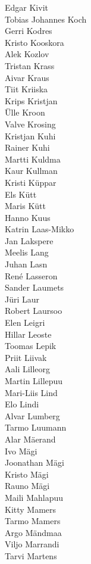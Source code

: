 \begin{multicols}{3}
Edgar Kivit\\
Tobias Johannes Koch\\
Gerri Kodres\\
Kristo Kooskora\\
Alek Kozlov\\
Tristan Krass\\
Aivar Kraus\\
Tiit Kriiska\\
Krips Kristjan\\
Ülle Kroon\\
Valve Krosing\\
Kristjan Kuhi\\
Rainer Kuhi\\
Martti Kuldma\\
Kaur Kullman\\
Kristi Küppar\\
Els Kütt\\
Maris Kütt\\
Hanno Kuus\\
Katrin Laas-Mikko\\
Jan Lakspere\\
Meelis Lang\\
Juhan Lasn\\
René Lasseron\\
Sander Laumets\\
Jüri Laur\\
Robert Laursoo\\
Elen Leigri\\
Hillar Leoste\\
Toomas Lepik\\
Priit Liivak\\
Aali Lilleorg\\
Martin Lillepuu\\
Mari-Liis Lind\\
Elo Lindi\\
Alvar Lumberg\\
Tarmo Luumann\\
Alar Mäerand\\
Ivo Mägi\\
Joonathan Mägi\\
Kristo Mägi\\
Rauno Mägi\\
Maili Mahlapuu\\
Kitty Mamers\\
Tarmo Mamers\\
Argo Mändmaa\\
Viljo Marrandi\\
Tarvi Martens\\

\end{multicols}
